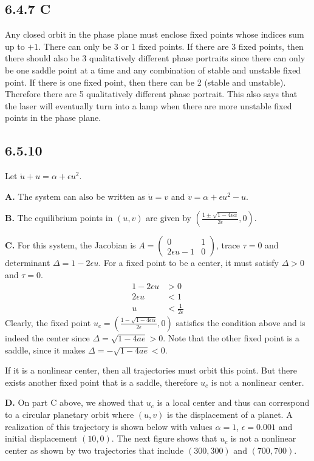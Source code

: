 \documentclass[]{article}
\begin{document}
	\subsection*{6.4.7 C}
	
	Any closed orbit in the phase plane must enclose fixed points whose indices sum up to $+1$. There can only be 3 or 1 fixed points. If there are 3 fixed points, then there should also be 3 qualitatively different phase portraits since there can only be one saddle point at a time and any combination of stable and unstable fixed point. If there is one fixed point, then there can be 2 (stable and unstable). Therefore there are 5 qualitatively different phase portrait. This also says that the laser will eventually turn into a lamp when there are more unstable fixed points in the phase plane.
	
	\subsection*{6.5.10} Let $\ddot{u}+u=\alpha+\epsilon u^2$.
	
	\textbf{A.} The system can also be written as $\dot{u}=v$ and $\dot{v}=\alpha+\epsilon u^2-u$.
	
	\textbf{B.} The equilibrium points in $(u,v)$ are given by $\left(\frac{1\pm\sqrt{1-4\epsilon\alpha}}{2\epsilon},0\right)$.
	
	\textbf{C.} For this system, the Jacobian is $A=\begin{pmatrix}
	0&1\\
	2\epsilon u-1 & 0
	\end{pmatrix}$, trace $\tau=0$ and determinant $\Delta=1-2\epsilon u$. For a fixed point to be a center, it must satisfy $\Delta>0$ and $\tau=0$.
	\begin{align*}
	1-2\epsilon u &> 0\\
	2\epsilon u &< 1\\
	u &< \frac{1}{2\epsilon}
	\end{align*}
	Clearly, the fixed point $u_c=\left(\frac{1-\sqrt{1-4\epsilon\alpha}}{2\epsilon},0\right)$ satisfies the condition above and is indeed the center since $\Delta=\sqrt{1-4 a e}>0$. Note that the other fixed point is a saddle, since it makes $\Delta=-\sqrt{1-4 a e}<0$.
	
	If it is a nonlinear center, then all trajectories must orbit this point. But  there exists another fixed point that is a saddle, therefore $u_c$ is not a nonlinear center.
	
	\textbf{D.} On part C above, we showed that $u_c$ is a local center and thus can correspond to a circular planetary orbit where $(u,v)$ is the displacement of a planet. A realization of this trajectory is shown below with values $\alpha=1$, $\epsilon=0.001$ and initial displacement $(10,0)$. The next figure shows that $u_c$ is not a nonlinear center as shown by two trajectories that include $(300,300)$ and $(700,700)$.
	
\end{document}
